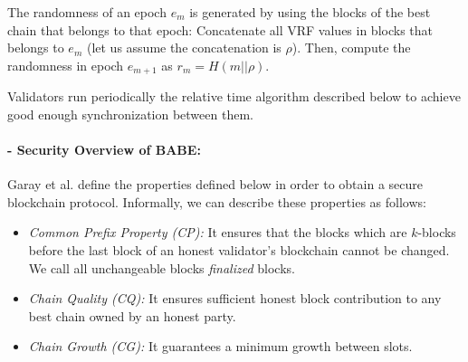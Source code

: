The randomness of an epoch $e_m$ is generated by using the blocks of the best chain that belongs to that epoch: Concatenate all  VRF values in blocks that belongs to $e_m$  (let us assume  the concatenation is \(\rho\)). Then, compute the randomness in epoch $e_{m+1}$ as $r_{m} = H(m
||\rho)$. 

Validators run periodically the relative time algorithm described below to achieve good enough synchronization between them.




\paragraph{- Security Overview of BABE:} Garay et al. \cite{backbone} define the properties defined below in order to obtain a secure blockchain protocol. Informally, we can describe these properties as follows:

\begin{itemize}
	\item \emph{Common Prefix Property (CP):} It ensures that the blocks which are $ k $-blocks before the last block of an honest validator's blockchain cannot be changed. We call  all unchangeable blocks  \emph{finalized} blocks.
	\item \emph{Chain Quality (CQ):} It ensures sufficient honest block contribution to any best chain owned by an honest party.	
	\item \emph{Chain Growth (CG):} It guarantees a minimum growth between slots.	
\end{itemize}
